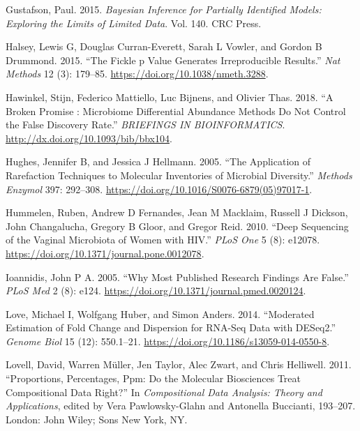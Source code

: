 \documentclass[
]{article}
\newlength{\cslhangindent}
\newlength{\cslentryspacingunit} %
\newenvironment{CSLReferences}[2] %
 {%
  \setlength{\parindent}{0pt}
  \ifodd #1
  \let\oldpar\par
  \def\par{\hangindent=\cslhangindent\oldpar}
  \fi
  \setlength{\parskip}{#2\cslentryspacingunit}
 }%
 {}
\begin{document}
\begin{CSLReferences}{1}{0}
\leavevmode{}%
Gustafson, Paul. 2015. \emph{Bayesian Inference for Partially Identified
Models: Exploring the Limits of Limited Data}. Vol. 140. CRC Press.

\leavevmode{}%
Halsey, Lewis G, Douglas Curran-Everett, Sarah L Vowler, and Gordon B
Drummond. 2015. {``The Fickle p Value Generates Irreproducible
Results.''} \emph{Nat Methods} 12 (3): 179--85.
\url{https://doi.org/10.1038/nmeth.3288}.

\leavevmode{}%
Hawinkel, Stijn, Federico Mattiello, Luc Bijnens, and Olivier Thas.
2018. {``A Broken Promise : Microbiome Differential Abundance Methods Do
Not Control the False Discovery Rate.''} \emph{BRIEFINGS IN
BIOINFORMATICS}. \url{http://dx.doi.org/10.1093/bib/bbx104}.

\leavevmode{}%
Hughes, Jennifer B, and Jessica J Hellmann. 2005. {``The Application of
Rarefaction Techniques to Molecular Inventories of Microbial
Diversity.''} \emph{Methods Enzymol} 397: 292--308.
\url{https://doi.org/10.1016/S0076-6879(05)97017-1}.

\leavevmode{}%
Hummelen, Ruben, Andrew D Fernandes, Jean M Macklaim, Russell J Dickson,
John Changalucha, Gregory B Gloor, and Gregor Reid. 2010. {``Deep
Sequencing of the Vaginal Microbiota of Women with {HIV}.''} \emph{PLoS
One} 5 (8): e12078. \url{https://doi.org/10.1371/journal.pone.0012078}.

\leavevmode{}%
Ioannidis, John P A. 2005. {``Why Most Published Research Findings Are
False.''} \emph{PLoS Med} 2 (8): e124.
\url{https://doi.org/10.1371/journal.pmed.0020124}.

\leavevmode{}%
Love, Michael I, Wolfgang Huber, and Simon Anders. 2014. {``Moderated
Estimation of Fold Change and Dispersion for RNA-Seq Data with
DESeq2.''} \emph{Genome Biol} 15 (12): 550.1--21.
\url{https://doi.org/10.1186/s13059-014-0550-8}.

\leavevmode{}%
Lovell, David, Warren Müller, Jen Taylor, Alec Zwart, and Chris
Helliwell. 2011. {``Proportions, Percentages, Ppm: Do the Molecular
Biosciences Treat Compositional Data Right?''} In \emph{Compositional
Data Analysis: Theory and Applications}, edited by Vera Pawlowsky-Glahn
and Antonella Buccianti, 193--207. London: John Wiley; Sons New York,
NY.


\end{CSLReferences}
\end{document}
